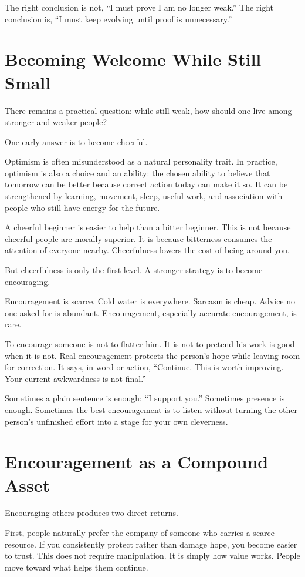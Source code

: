 The right conclusion is not, ``I must prove I am no longer weak.'' The right conclusion is, ``I must keep evolving until proof is unnecessary.''

\section*{Becoming Welcome While Still Small}

There remains a practical question: while still weak, how should one live among stronger and weaker people?

One early answer is to become cheerful.

Optimism is often misunderstood as a natural personality trait. In practice, optimism is also a choice and an ability: the chosen ability to believe that tomorrow can be better because correct action today can make it so. It can be strengthened by learning, movement, sleep, useful work, and association with people who still have energy for the future.

A cheerful beginner is easier to help than a bitter beginner. This is not because cheerful people are morally superior. It is because bitterness consumes the attention of everyone nearby. Cheerfulness lowers the cost of being around you.

But cheerfulness is only the first level. A stronger strategy is to become encouraging.

Encouragement is scarce. Cold water is everywhere. Sarcasm is cheap. Advice no one asked for is abundant. Encouragement, especially accurate encouragement, is rare.

To encourage someone is not to flatter him. It is not to pretend his work is good when it is not. Real encouragement protects the person's hope while leaving room for correction. It says, in word or action, ``Continue. This is worth improving. Your current awkwardness is not final.''

Sometimes a plain sentence is enough: ``I support you.'' Sometimes presence is enough. Sometimes the best encouragement is to listen without turning the other person's unfinished effort into a stage for your own cleverness.

\section*{Encouragement as a Compound Asset}

Encouraging others produces two direct returns.

First, people naturally prefer the company of someone who carries a scarce resource. If you consistently protect rather than damage hope, you become easier to trust. This does not require manipulation. It is simply how value works. People move toward what helps them continue.

